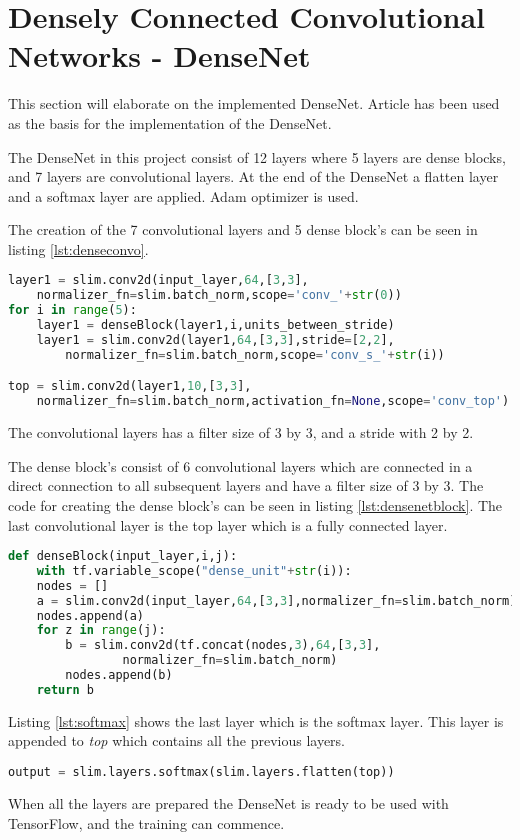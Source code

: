 \section{Densely Connected Convolutional Networks - DenseNet}

This section will elaborate on the implemented DenseNet. Article \citep{DENSE} has been used as the basis for the implementation of the DenseNet.

The DenseNet in this project consist of 12 layers where 5 layers are dense blocks, and 7 layers are convolutional layers. At the end of the DenseNet a flatten layer and a softmax layer are applied. Adam optimizer is used.

The creation of the 7 convolutional layers and 5 dense block's can be seen in listing \ref{lst:denseconvo}.

\begin{lstlisting}[language=Python, label=lst:denseconvo, caption=for loop whicifarh creates the dense block's mixed with the convolutional layers]
layer1 = slim.conv2d(input_layer,64,[3,3],
	normalizer_fn=slim.batch_norm,scope='conv_'+str(0))
for i in range(5):
	layer1 = denseBlock(layer1,i,units_between_stride)
	layer1 = slim.conv2d(layer1,64,[3,3],stride=[2,2],
		normalizer_fn=slim.batch_norm,scope='conv_s_'+str(i))

top = slim.conv2d(layer1,10,[3,3],
	normalizer_fn=slim.batch_norm,activation_fn=None,scope='conv_top')
\end{lstlisting}

The convolutional layers has a filter size of 3 by 3, and a stride with 2 by 2. 

The dense block's consist of 6 convolutional layers which are connected in a direct connection to all subsequent layers and have a filter size of 3 by 3. The code for creating the dense block's can be seen in listing \ref{lst:densenetblock}. The last convolutional layer is the top layer which is a fully connected layer.

\begin{lstlisting}[language=Python, label=lst:densenetblock, caption=DenseNet Block function]
def denseBlock(input_layer,i,j):
	with tf.variable_scope("dense_unit"+str(i)):
	nodes = []
	a = slim.conv2d(input_layer,64,[3,3],normalizer_fn=slim.batch_norm)
	nodes.append(a)
	for z in range(j):
		b = slim.conv2d(tf.concat(nodes,3),64,[3,3],
				normalizer_fn=slim.batch_norm)
		nodes.append(b)
	return b
\end{lstlisting}

Listing \ref{lst:softmax} shows the last layer which is the softmax layer. This layer is appended to \emph{top} which contains all the previous layers.

\begin{lstlisting}[language=Python, label=lst:softmax, caption=Softmax layer appended to the end of the DenseNet]
output = slim.layers.softmax(slim.layers.flatten(top))
\end{lstlisting}

When all the layers are prepared the DenseNet is ready to be used with TensorFlow, and the training can commence.